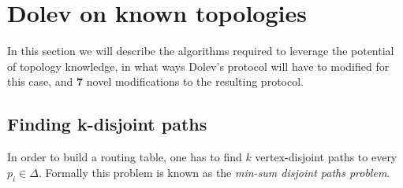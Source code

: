 




\section{Dolev on known topologies}
\label{contr-dolev}
In this section we will describe the algorithms required to leverage the potential of topology knowledge, in what ways Dolev's protocol will have to modified for this case, and \textbf{7} novel modifications to the resulting protocol.

\subsection{Finding k-disjoint paths}
In order to build a routing table, one has to find $k$ vertex-disjoint paths to every $p_i \in \Delta$. Formally this problem is known as the \textit{min-sum disjoint paths problem}.


